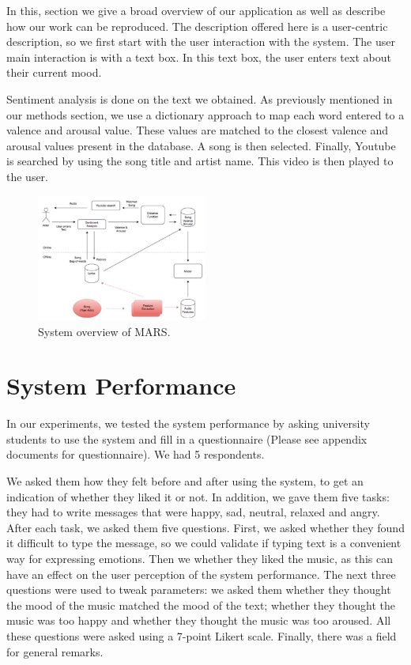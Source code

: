 \documentclass[10pt,journal,compsoc]{IEEEtran}
\begin{document}
In this, section we give a broad overview of our application as well as describe how our work can be reproduced. The description offered here is a user-centric description, so we first start with the user interaction with the system. The user main interaction is with a text box. In this text box, the user enters text about their current mood. 

Sentiment analysis is done on the text we obtained. As previously mentioned in our methods section, we use a dictionary approach to map each word entered to a valence and arousal value. These values are matched to the closest valence and arousal values present in the database. A song is then selected. Finally, Youtube is searched by using the song title and artist name. This video is then played to the user.

\begin{figure}[h!]
	\centering
	\includegraphics[width=0.5\textwidth]{"schema"}
	\caption{System overview of MARS.}
\end{figure}	
	
	\section{System Performance}
	In our experiments, we tested the system performance by asking university students to use the system and fill in a questionnaire (Please see appendix documents for questionnaire). We had 5 respondents. 
	
	We asked them how they felt before and after using the system, to get an indication of whether they liked it or not. In addition, we gave them five tasks: they had to write messages that were happy, sad, neutral, relaxed and angry. After each task, we asked them five questions. First, we asked whether they found it difficult to type the message, so we could validate if typing text is a convenient way for expressing emotions. Then we whether they liked the music, as this can have an effect on the user perception of the system performance. The next three questions were used to tweak parameters: we asked them whether they thought the mood of the music matched the mood of the text; whether they thought the music was too happy and whether they thought the music was too aroused. All these questions were asked using a 7-point Likert scale. Finally, there was a field for general remarks.
	
\end{document}

